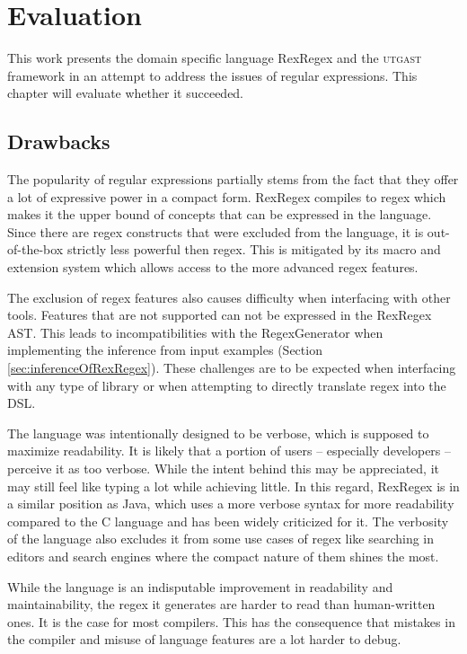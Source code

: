 \chapter{Evaluation}

This work presents the domain specific language RexRegex and the \textsc{utgast} framework in an attempt to address the issues of regular expressions. This chapter will evaluate whether it succeeded.

\section{Drawbacks}

The popularity of regular expressions partially stems from the fact that they offer a lot of expressive power in a compact form. RexRegex compiles to regex which makes it the upper bound of concepts that can be expressed in the language. Since there are regex constructs that were excluded from the language, it is out-of-the-box strictly less powerful then regex. This is mitigated by its macro and extension system which allows access to the more advanced regex features.

The exclusion of regex features also causes difficulty when interfacing with other tools. Features that are not supported can not be expressed in the RexRegex AST. This leads to incompatibilities with the RegexGenerator \cite{bartoli2016inference} when implementing the inference from input examples (Section \ref{sec:inferenceOfRexRegex}). These challenges are to be expected when interfacing with any type of library or when attempting to directly translate regex into the DSL.

The language was intentionally designed to be verbose, which is supposed to maximize readability. It is likely that a portion of users -- especially developers -- perceive it as too verbose. While the intent behind this may be appreciated, it may still feel like typing a lot while achieving little. In this regard, RexRegex is in a similar position as Java, which uses a more verbose syntax for more readability compared to the C language and has been widely criticized for it. The verbosity of the language also excludes it from some use cases of regex like searching in editors and search engines where the compact nature of them shines the most.

While the language is an indisputable improvement in readability and maintainability, the regex it generates are harder to read than human-written ones. It is the case for most compilers. This has the consequence that mistakes in the compiler and misuse of language features are a lot harder to debug.

